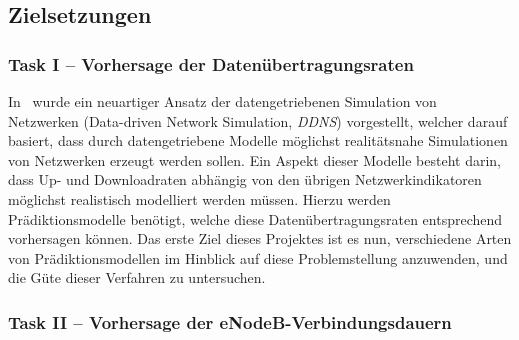 \subsection{Zielsetzungen}

\subsubsection{Task I -- Vorhersage der Daten\"ubertragungsraten}

In~\cite{IEEE} wurde ein neuartiger Ansatz der datengetriebenen Simulation von Netzwerken
(Data-driven Network Simulation, \textit{DDNS}) vorgestellt, welcher darauf basiert, dass durch datengetriebene Modelle m\"oglichst
realit\"atsnahe Simulationen von Netzwerken erzeugt werden sollen.
Ein Aspekt dieser Modelle besteht darin, dass Up- und Down\-load\-ra\-ten abh\"angig von den \"ubrigen Netzwerkindikatoren 
m\"oglichst realistisch modelliert werden m\"ussen.
Hierzu werden Pr\"adiktionsmodelle ben\"otigt, welche diese Da\-ten\-\"uber\-tra\-gungs\-ra\-ten entsprechend vorhersagen k\"onnen.
Das erste Ziel dieses Projektes ist es nun, verschiedene Arten von Pr\"a\-dik\-tions\-mo\-dellen im Hinblick auf diese Problemstellung
an\-zu\-wen\-den, und die G\"ute dieser Verfahren zu untersuchen.

\subsubsection{Task II -- Vorhersage der eNodeB-Verbindungsdauern}